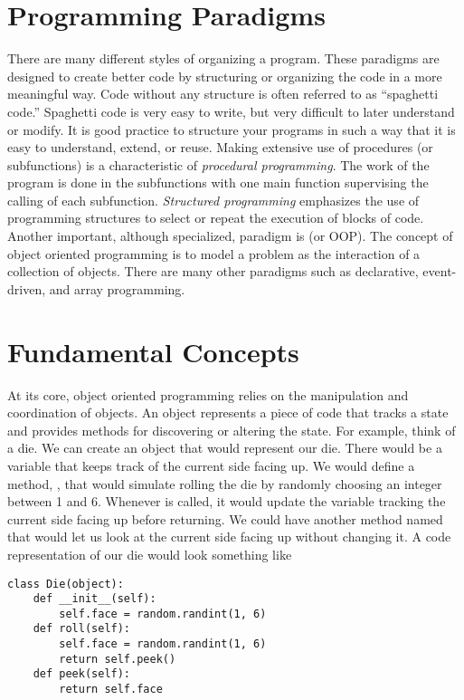 \label{lab:OOP}

\section*{Programming Paradigms}
There are many different styles of organizing a program.  
These paradigms are designed to create better code by structuring or organizing the code in a more meaningful way.
Code without any structure is often referred to as ``spaghetti code.''
Spaghetti code is very easy to write, but very difficult to later understand or modify.
It is good practice to structure your programs in such a way that it is easy to understand, extend, or reuse.
Making extensive use of procedures (or subfunctions) is a characteristic of \emph{procedural programming}.
The work of the program is done in the subfunctions with one main function supervising the calling of each subfunction.
\emph{Structured programming} emphasizes the use of programming structures to select or repeat the execution of blocks of code.
Another important, although specialized, paradigm is  (or OOP).
The concept of object oriented programming is to model a problem as the interaction of a collection of objects.
There are many other paradigms such as declarative, event-driven, and array programming.

\section*{Fundamental Concepts}
At its core, object oriented programming relies on the manipulation and coordination of objects.
An object represents a piece of code that tracks a state and provides methods for discovering or altering the state.  For example, think of a die.  We can create an object that would represent our die.  There would be a variable that keeps track of the current side facing up.  We would define a method, , that would simulate rolling the die by randomly choosing an integer between 1 and 6.  Whenever  is called, it would update the variable tracking the current side facing up before returning.  We could have another method named  that would let us look at the current side facing up without changing it.  A code representation of our die would look something like
\begin{lstlisting}
class Die(object):
    def __init__(self):
        self.face = random.randint(1, 6)
    def roll(self):
        self.face = random.randint(1, 6)
        return self.peek()
    def peek(self):
        return self.face
\end{lstlisting}

